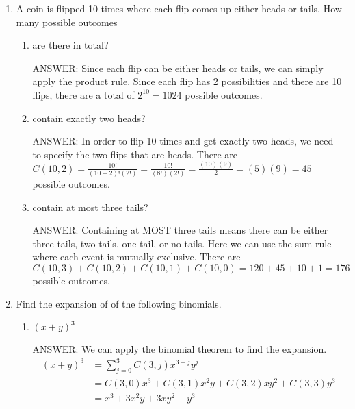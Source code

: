 \documentclass[12pt]{article}
\newcommand\buf{\vspace{0.10in}}
\newenvironment{answer}{\fontfamily{ptm}\selectfont \smaller[1] ANSWER: }{}
\begin{document}
\begin{enumerate}

\item A coin is flipped 10 times where each flip comes up either heads or tails. How many possible outcomes

\begin{enumerate}

    \item are there in total?
    \buf

    \begin{answer}
        Since each flip can be either heads or tails, we can simply apply the product rule. Since each flip has 2 possibilities and there are 10 flips, there are a total of $2^{10} = 1024$ possible outcomes.
    \end{answer}
    \buf

    \item contain exactly two heads?
    \buf

    \begin{answer}
        In order to flip 10 times and get exactly two heads, we need to specify the two flips that are heads. There are $C(10, 2) = \frac{10!}{(10-2)!(2!)} = \frac{10!}{(8!)(2!)} = \frac{(10)(9)}{2} = (5)(9) = 45$ possible outcomes.
    \end{answer}
    \buf

    \item contain at most three tails?
    \buf

    \begin{answer}
        Containing at MOST three tails means there can be either three tails, two tails, one tail, or no tails. Here we can use the sum rule where each event is mutually exclusive. There are $C(10,3) + C(10, 2) + C(10, 1) + C(10, 0) = 120 + 45 + 10 + 1 = 176$ possible outcomes.
    \end{answer}
    \buf

\end{enumerate}




\item Find the expansion of of the following binomials.

\begin{enumerate}

    \item $(x+y)^{3}$
    \buf

    \begin{answer}
        We can apply the binomial theorem to find the expansion.
        \begin{align*}
            (x+y)^{3} &= \sum_{j=0}^{3} C(3, j) x^{3-j}y^{j} \\
            &= C(3, 0) x^{3} + C(3, 1) x^{2}y + C(3, 2) xy^{2} + C(3, 3) y^{3} \\
            &= x^{3} + 3x^{2}y + 3xy^{2} + y^{3}
        \end{align*}
    \end{answer}
    \buf


\end{enumerate}
\end{enumerate}
\end{document}
